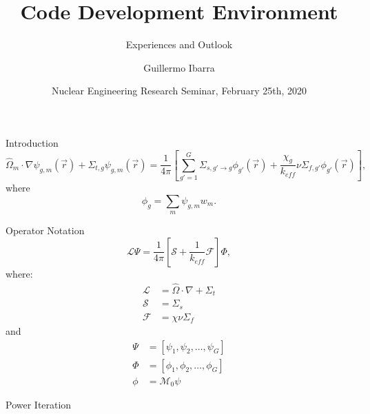 \documentclass[sans,mathserif,aspectratio=169]{beamer}
\title{Code Development Environment}
\subtitle{Experiences and Outlook}
\author[Guillermo Ibarra]{Guillermo Ibarra}
\date{Nuclear Engineering Research Seminar, February 25th, 2020}
\begin{document}
\begin{frame}
\titlepage
\end{frame}

\begin{frame}{Introduction}
\begin{equation*}
\hat{\Omega}_m \cdot \nabla \psi_{g,m} \left(  \vec{r} \right) + \Sigma_{t,g}\psi_{g,m} \left( \vec{r} \right) = \frac{1}{4\pi} \left[\sum\limits_{g'=1}^{G} \Sigma_{s, g' \to g} \phi_{g'} \left( \vec{r} \right) + \frac{\chi_g}{k_{e\!\!f\!\!\!f}} \nu \Sigma_{f, g'} \phi_{g'}  \left( \vec{r} \right) \right],
\end{equation*}
\pause
where
\begin{equation*}
\phi_g = \sum_m \psi_{g,m} w_m.
\end{equation*}
\end{frame}

\begin{frame}{Operator Notation}
\begin{equation*}
\mathscr{L} \Psi = \frac{1}{4\pi} \left[ \mathscr{S} + \frac{1}{k_{e\!\!f\!\!\!f}} \mathscr{F} \right] \Phi,
\end{equation*}
where:
\begin{align*}
\mathscr{L} &= \hat{\Omega} \cdot \nabla + \Sigma_t \\
\mathscr{S} &= \Sigma_s  \\
\mathscr{F} &= \chi \nu \Sigma_f
\end{align*}
and
\begin{align}
\Psi &= \left[ \psi_1, \psi_2, \dotso, \psi_G \right] \nonumber \\
\Phi &= \left[ \phi_1, \phi_2, \dotso, \phi_G \right] \nonumber \\
\phi &= \mathscr{M}_0 \psi \nonumber
\end{align}
\end{frame}

\begin{frame}{Power Iteration}
\centering
{}
\end{frame}
\end{document}
